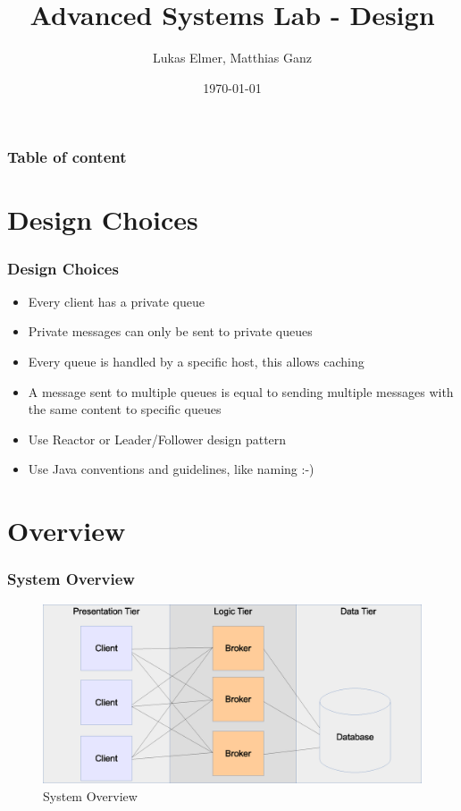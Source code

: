 \documentclass{beamer}
\title{Advanced Systems Lab - Design}
\author{Lukas Elmer, Matthias Ganz}
\date{\today}
\begin{document}
\begin{frame}
\titlepage
\end{frame} 

\begin{frame}
\frametitle{Table of content}
\tableofcontents
\end{frame} 


\section{Design Choices}
\begin{frame}
\frametitle{Design Choices}

\begin{itemize}
\item{Every client has a private queue}
\item{Private messages can only be sent to private queues}
\item{Every queue is handled by a specific host, this allows caching}
\item{A message sent to multiple queues is equal to sending multiple messages with the same content to specific queues}
\item{Use Reactor or Leader/Follower design pattern}
\item{Use Java conventions and guidelines, like naming :-)}
\end{itemize}

\end{frame}



\section{Overview}
\begin{frame}
\frametitle{System Overview}

\begin{figure}
  \begin{center}
  
    \includegraphics[scale=0.3]{../../drawings/system-overview.eps}
    
  \end{center}
  \caption{System Overview}
  \label{fig:system-overview}
\end{figure}


\end{frame}
\end{document}
